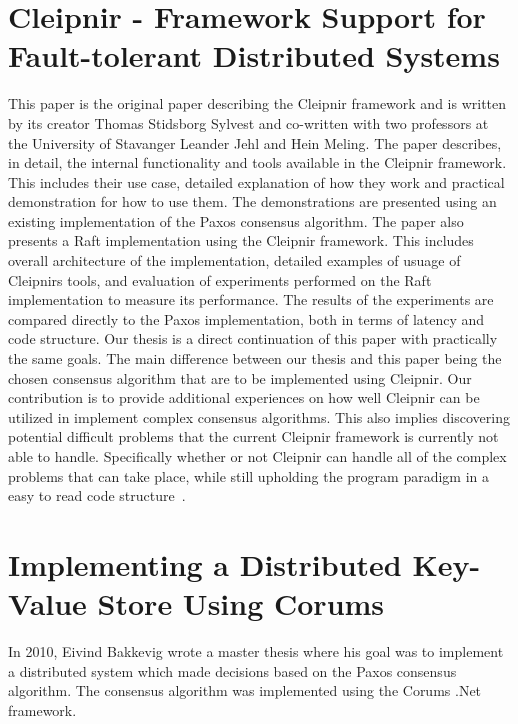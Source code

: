 \section{Cleipnir - Framework Support for Fault-tolerant Distributed Systems}
This paper is the original paper describing the Cleipnir framework and is written by its creator Thomas Stidsborg Sylvest and co-written with two professors at the University of Stavanger Leander Jehl and Hein Meling. The paper describes, in detail, the internal functionality and tools available in the Cleipnir framework. This includes their use case, detailed explanation of how they work and practical demonstration for how to use them. The demonstrations are presented using an existing implementation of the Paxos consensus algorithm. The paper also presents a Raft implementation using the Cleipnir framework. This includes overall architecture of the implementation, detailed examples of usuage of Cleipnirs tools, and evaluation of experiments performed on the Raft implementation to measure its performance. The results of the experiments are compared directly to the Paxos implementation, both in terms of latency and code structure. Our thesis is a direct continuation of this paper with practically the same goals. The main difference between our thesis and this paper being the chosen consensus algorithm that are to be implemented using Cleipnir. Our contribution is to provide additional experiences on how well Cleipnir can be utilized in implement complex consensus algorithms. This also implies discovering potential difficult problems that the current Cleipnir framework is currently not able to handle. Specifically whether or not Cleipnir can handle all of the complex problems that can take place, while still upholding the program paradigm in a easy to read code structure~\cite{PAPER:PaxosCleipnir}.

\section{Implementing a Distributed Key-Value Store Using Corums}
In 2010, Eivind Bakkevig wrote a master thesis where his goal was to implement a distributed system which made decisions based on the Paxos consensus algorithm. The consensus algorithm was implemented using the Corums .Net framework. 

